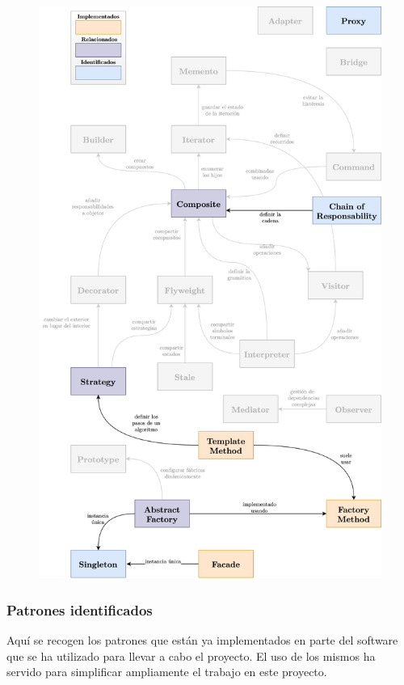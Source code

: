 \documentclass[../ei103948-project-documentation.tex]{subfiles}
\begin{document}
                \newpage
                \begin{figure}[H]
                    \begin{center}
                        \hspace*{-10mm}
                    \includegraphics[scale=0.125]{images/PatronesUtilizadosEsquema.png}
                    \end{center}
                \end{figure}
            
                    \subsubsection{Patrones identificados}
                        Aquí se recogen los patrones que están ya implementados en parte del software que se ha utilizado para llevar a cabo el proyecto. El uso de los mismos ha servido para simplificar ampliamente el trabajo en este proyecto.
            
\end{document}
